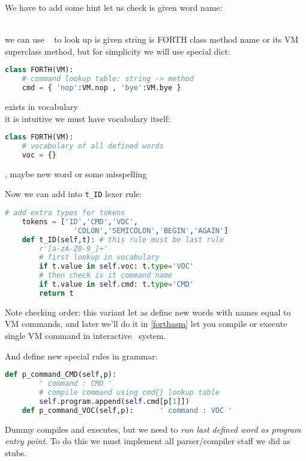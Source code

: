 We have to add some hint let us check is given word name:
\begin{description}[nosep]
\item[VM command]\ \\
we can use \py\  to look up is given string is FORTH
class method name or its VM superclass method, but for simplicity we will use
special dict:
\begin{lstlisting}[language=Python]
class FORTH(VM):
	# command lookup table: string -> method
	cmd = { 'nop':VM.nop , 'bye':VM.bye }
\end{lstlisting}
\item[already defined word] exists in vocabulary\\
it is intuitive we must have vocabulary itself:
\begin{lstlisting}[language=Python]
class FORTH(VM):
	# vocabulary of all defined words
	voc = {}
\end{lstlisting}
\item[undetected ID], maybe new word or some misspelling
\end{description}
Now we can add  into \verb|t_ID| lexer rule:
\begin{lstlisting}[language=Python]
	# add extra types for tokens
	tokens = ['ID','CMD','VOC',
				'COLON','SEMICOLON','BEGIN','AGAIN']
 	def t_ID(self,t): # this rule must be last rule
 		r'[a-zA-Z0-9_]+'
 		# first lookup in vocabulary
 		if t.value in self.voc: t.type='VOC'
 		# then check is it command name
 		if t.value in self.cmd: t.type='CMD'
 		return t 
\end{lstlisting}
Note checking order: this variant let as define new words with names equal to VM
commands, and later we'll do it in  \ref{forthasm} let you
compile or execute single VM command in interactive \F\ system.

\clearpage
And define new special rules in grammar:
\begin{lstlisting}[language=Python]
 	def p_command_CMD(self,p):
 		' command : CMD '
 		# compile command using cmd{} lookup table
 		self.program.append(self.cmd[p[1]])
 	def p_command_VOC(self,p):		' command : VOC '
\end{lstlisting}

Dummy compiles and executes, but
we need to \emph{run last defined word as program entry point}. To do this we
must implement all parser/compiler staff we did as stubs.

